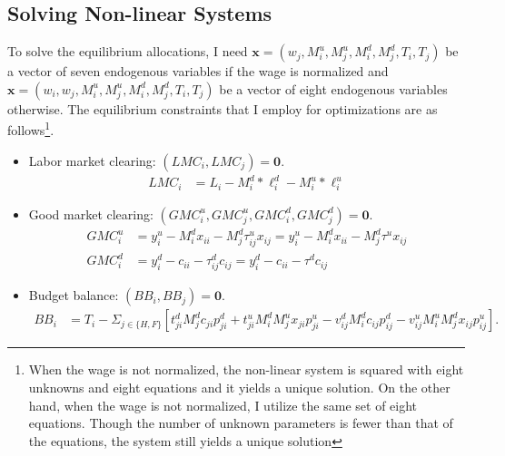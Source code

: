 \documentclass{homeworg}
\begin{document}
\subsection{Solving Non-linear Systems}

To solve the equilibrium allocations, I need $\boldsymbol{x}=(w_{j}, M^{u}_{i}, M^{u}_{j}, M^{d}_{i}, M^{d}_{j}, T_{i}, T_{j})$ be a vector of seven endogenous variables if the wage is normalized and $\boldsymbol{x}=(w_{i}, w_{j}, M^{u}_{i}, M^{u}_{j}, M^{d}_{i}, M^{d}_{j}, T_{i}, T_{j})$ be a vector of eight endogenous variables otherwise. The equilibrium constraints that I employ for optimizations are as follows\footnote{When the wage is not normalized, the non-linear system is squared with eight unknowns and eight equations and it yields a unique solution. On the other hand, when the wage is not normalized, I utilize the same set of eight equations. Though the number of unknown parameters is fewer than that of the equations, the system still yields a unique solution}.
\begin{itemize}[ref=Step , wide=0pt]
\item Labor market clearing: $(LMC_{i}, LMC_{j})=\boldsymbol{0}$.
\begin{equation}
\begin{aligned}
\label{eq:lmc}
LMC_{i} &= L_{i}-M^{d}_{i}*\ell^{d}_{i}-M^{u}_{i}*\ell^{u}_{i}
\end{aligned}
\end{equation}
\label{eq:gmc}
\item Good market clearing: $(GMC^{u}_{i}, GMC^{u}_{j}, GMC^{d}_{i}, GMC^{d}_{j})=\boldsymbol{0}$.
\begin{equation}
\begin{aligned}
\label{eq:gmc}
GMC^{u}_{i} &= y^{u}_{i}-M^{d}_{i}x_{ii}-M^{d}_{j}\tau^{u}_{ij}x_{ij} = y^{u}_{i}-M^{d}_{i}x_{ii}-M^{d}_{j}\tau^{u}x_{ij}\\
GMC^{d}_{i} &= y^{d}_{i}-c_{ii}-\tau^{d}_{ij}c_{ij} = y^{d}_{i}-c_{ii}-\tau^{d}c_{ij}
\end{aligned}
\end{equation}
\item Budget balance: $(BB_{i}, BB_{j})=\boldsymbol{0}$.
\begin{equation}
\begin{aligned}
\label{eq:bb}
BB_{i} &= T_{i} - \Sigma_{j\in\{H,F\}}[t^d_{ji}M^{d}_{j}c_{ji}p^{d}_{ji}+t^{u}_{ji}M^{d}_{i}M^{u}_{j}x_{ji}p^{u}_{ji}-v^{d}_{ij}M^{d}_{i}c_{ij}p^{d}_{ij}-v^{u}_{ij}M^{u}_{i}M^{d}_{j}x_{ij}p^{u}_{ij}].
\end{aligned}
\end{equation}
\end{itemize}
\end{document}
